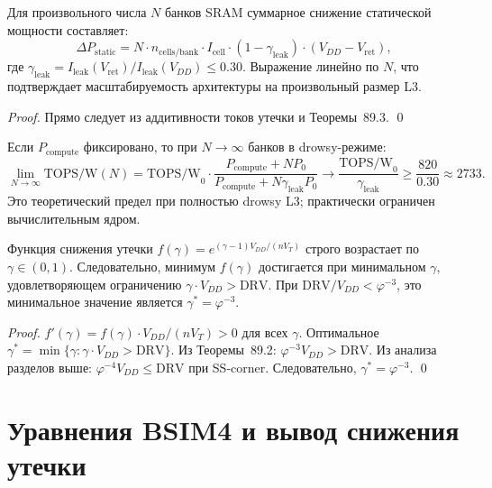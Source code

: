 \begin{corollary}
\label{cor:n-banks}
Для произвольного числа $N$ банков SRAM суммарное снижение
статической мощности составляет:
\[
  \Delta P_\mathrm{static} = N \cdot n_\mathrm{cells/bank} \cdot I_\mathrm{cell}
    \cdot (1 - \gamma_\mathrm{leak}) \cdot (V_{DD} - V_\mathrm{ret}),
\]
где $\gamma_\mathrm{leak} = I_\mathrm{leak}(V_\mathrm{ret})/I_\mathrm{leak}(V_{DD}) \leq 0.30$.
Выражение линейно по $N$, что подтверждает масштабируемость
архитектуры на произвольный размер L3.
\end{corollary}
\begin{proof}
Прямо следует из аддитивности токов утечки и Теоремы~89.3.
\qed
\end{proof}

\begin{corollary}
\label{cor:tops-n}
Если $P_\mathrm{compute}$ фиксировано, то при $N \to \infty$
банков в drowsy-режиме:
\[
  \lim_{N \to \infty} \mathrm{TOPS/W}(N)
  = \mathrm{TOPS/W}_0 \cdot \frac{P_\mathrm{compute} + N P_0}{P_\mathrm{compute} + N \gamma_\mathrm{leak} P_0}
  \to \frac{\mathrm{TOPS/W}_0}{\gamma_\mathrm{leak}}
  \geq \frac{820}{0.30} \approx 2733.
\]
Это теоретический предел при полностью drowsy L3; практически
ограничен вычислительным ядром.
\end{corollary}

\begin{lemma}
\label{lem:monotone-gamma}
Функция снижения утечки $f(\gamma) = e^{(\gamma-1)V_{DD}/(nV_T)}$
строго возрастает по $\gamma \in (0,1)$.
Следовательно, минимум $f(\gamma)$ достигается при минимальном $\gamma$,
удовлетворяющем ограничению $\gamma \cdot V_{DD} > \mathrm{DRV}$.
При $\mathrm{DRV}/V_{DD} < \varphi^{-3}$, это минимальное значение
является $\gamma^* = \varphi^{-3}$.
\end{lemma}
\begin{proof}
$f'(\gamma) = f(\gamma) \cdot V_{DD}/(nV_T) > 0$ для всех $\gamma$.
Оптимальное $\gamma^* = \min\{\gamma : \gamma \cdot V_{DD} > \mathrm{DRV}\}$.
Из Теоремы~89.2: $\varphi^{-3} V_{DD} > \mathrm{DRV}$.
Из анализа разделов выше: $\varphi^{-4} V_{DD} \leq \mathrm{DRV}$ при SS-corner.
Следовательно, $\gamma^* = \varphi^{-3}$.
\qed
\end{proof}

\section{Уравнения BSIM4 и вывод снижения утечки}
\label{sec:glava89-bsim4}


